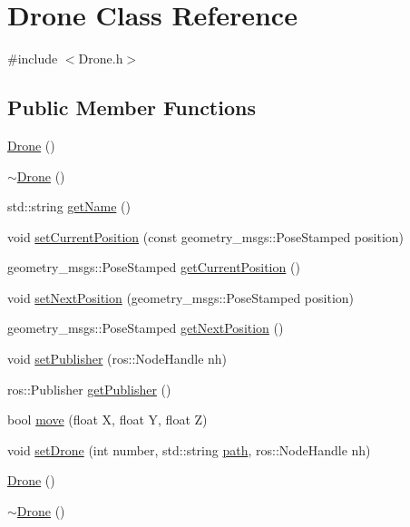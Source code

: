\hypertarget{classDrone}{}\section{Drone Class Reference}
\label{classDrone}


{\ttfamily \#include $<$Drone.\+h$>$}

\subsection*{Public Member Functions}
\begin{DoxyCompactItemize}
\item 
\hyperlink{classDrone_ab692baa4be5c43b72990ce1b01bdc805}{Drone} ()
\item 
\hyperlink{classDrone_a667075abb1eb5c54be6418884a387d14}{$\sim$\+Drone} ()
\item 
std\+::string \hyperlink{classDrone_a1fcaf0892001bf12b99c838e64878d9e}{get\+Name} ()
\item 
void \hyperlink{classDrone_a16ee9c16220886633f98e591c9e3dac5}{set\+Current\+Position} (const geometry\+\_\+msgs\+::\+Pose\+Stamped position)
\item 
geometry\+\_\+msgs\+::\+Pose\+Stamped \hyperlink{classDrone_a0113e8f3a3f438113dca0d77c065276b}{get\+Current\+Position} ()
\item 
void \hyperlink{classDrone_a9addfdac3dc0e676ba12c1f4ced68fbe}{set\+Next\+Position} (geometry\+\_\+msgs\+::\+Pose\+Stamped position)
\item 
geometry\+\_\+msgs\+::\+Pose\+Stamped \hyperlink{classDrone_a6a6df41b8eae2b1d6c2b66f046fe5a24}{get\+Next\+Position} ()
\item 
void \hyperlink{classDrone_a8d6917c3191ec7f675b246895ffa6a0d}{set\+Publisher} (ros\+::\+Node\+Handle nh)
\item 
ros\+::\+Publisher \hyperlink{classDrone_aac0983a112b0b3f75c0e625bcba3a330}{get\+Publisher} ()
\item 
bool \hyperlink{classDrone_a106284f63c05f3f112435b2cb5c4896c}{move} (float X, float Y, float Z)
\item 
void \hyperlink{classDrone_a8598b7ea716264e8428a4963a13252fb}{set\+Drone} (int number, std\+::string \hyperlink{classDrone_a19bf0a73d086997ba0589984c58b62da}{path}, ros\+::\+Node\+Handle nh)
\item 
\hyperlink{classDrone_ab692baa4be5c43b72990ce1b01bdc805}{Drone} ()
\item 
\hyperlink{classDrone_a667075abb1eb5c54be6418884a387d14}{$\sim$\+Drone} ()

\end{DoxyCompactItemize}
